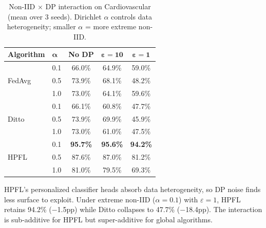 \documentclass[conference,a4paper]{IEEEtran}
\begin{document}
\begin{table}[htbp]
\centering
\caption{Non-IID $\times$ DP interaction on Cardiovascular (mean over 3 seeds). Dirichlet $\alpha$ controls data heterogeneity; smaller $\alpha$ = more extreme non-IID.}
\label{tab:noniid_dp}
\small
\begin{tabular}{llccc}
\toprule
\textbf{Algorithm} & $\boldsymbol{\alpha}$ & \textbf{No DP} & $\boldsymbol{\varepsilon{=}10}$ & $\boldsymbol{\varepsilon{=}1}$ \\
\midrule
\multirow{3}{*}{FedAvg} & 0.1 & 66.0\% & 64.9\% & 59.0\% \\
 & 0.5 & 73.9\% & 68.1\% & 48.2\% \\
 & 1.0 & 73.0\% & 64.1\% & 59.6\% \\
\midrule
\multirow{3}{*}{Ditto} & 0.1 & 66.1\% & 60.8\% & 47.7\% \\
 & 0.5 & 73.9\% & 69.9\% & 45.9\% \\
 & 1.0 & 73.0\% & 61.0\% & 47.5\% \\
\midrule
\multirow{3}{*}{HPFL} & 0.1 & \textbf{95.7\%} & \textbf{95.6\%} & \textbf{94.2\%} \\
 & 0.5 & 87.6\% & 87.0\% & 81.2\% \\
 & 1.0 & 81.0\% & 79.5\% & 69.3\% \\
\bottomrule
\end{tabular}

\vspace{1mm}
\footnotesize{HPFL's personalized classifier heads absorb data heterogeneity, so DP noise finds less surface to exploit. Under extreme non-IID ($\alpha{=}0.1$) with $\varepsilon{=}1$, HPFL retains 94.2\% ($-$1.5pp) while Ditto collapses to 47.7\% ($-$18.4pp). The interaction is sub-additive for HPFL but super-additive for global algorithms.}
\end{table}

\end{document}
